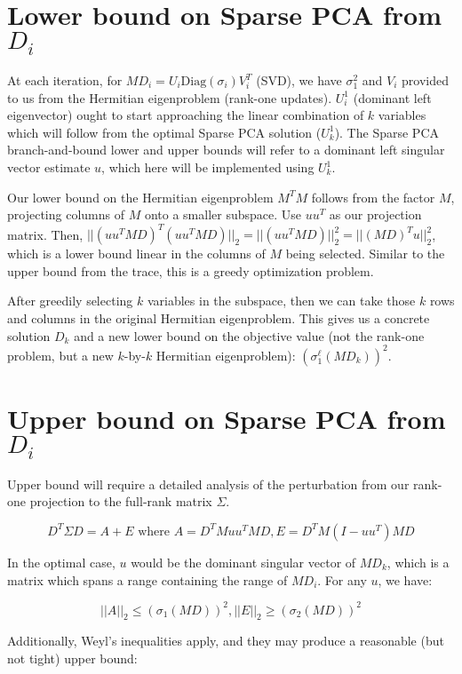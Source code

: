\documentclass{article}
\begin{document}
\section{Lower bound on Sparse PCA from $D_i$}

At each iteration, for $MD_i = U_i \text{Diag}(\sigma_i) V_i^T$ (SVD), we have $\sigma_1^2$ and $V_i$ provided to us from the Hermitian eigenproblem (rank-one updates). $U_i^1$ (dominant left eigenvector) ought to start approaching the linear combination of $k$ variables which will follow from the optimal Sparse PCA solution ($U_k^1$). The Sparse PCA branch-and-bound lower and upper bounds will refer to a dominant left singular vector estimate $u$, which here will be implemented using $U_k^1$.

Our lower bound on the Hermitian eigenproblem $M^T M$ follows from the factor $M$, projecting columns of $M$ onto a smaller subspace. Use $uu^T$ as our projection matrix. Then, $||(uu^T MD)^T (uu^T MD)||_2 = ||(uu^T MD)||_2^2 = ||(MD)^T u||_2^2$, which is a lower bound linear in the columns of $M$ being selected. Similar to the upper bound from the trace, this is a greedy optimization problem.

After greedily selecting $k$ variables in the subspace, then we can take those $k$ rows and columns in the original Hermitian eigenproblem. This gives us a concrete solution $D_k$ and a new lower bound on the objective value (not the rank-one problem, but a new $k$-by-$k$ Hermitian eigenproblem): $(\sigma_1^\ell(MD_k))^2$.

\section{Upper bound on Sparse PCA from $D_i$}

Upper bound will require a detailed analysis of the perturbation from our rank-one projection to the full-rank matrix $\Sigma$.

$$
D^T \Sigma D = A + E \text{ where } A = D^T M uu^T MD, E = D^T M (I-uu^T) MD
$$

In the optimal case, $u$ would be the dominant singular vector of $MD_k$, which is a matrix which spans a range containing the range of $MD_i$. For any $u$, we have:

$$
||A||_2 \le \left(\sigma_1(MD)\right)^2,
||E||_2 \ge \left(\sigma_2(MD)\right)^2
$$

Additionally, Weyl's inequalities apply, and they may produce a reasonable (but not tight) upper bound:
\end{document}
